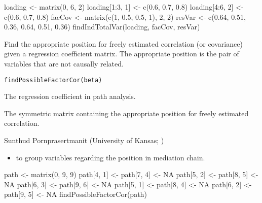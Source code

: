 \documentclass[a4paper]{book}
\begin{document}
%
\begin{Examples}
\begin{ExampleCode}
loading <- matrix(0, 6, 2)
loading[1:3, 1] <- c(0.6, 0.7, 0.8)
loading[4:6, 2] <- c(0.6, 0.7, 0.8)
facCov <- matrix(c(1, 0.5, 0.5, 1), 2, 2)
resVar <- c(0.64, 0.51, 0.36, 0.64, 0.51, 0.36)
findIndTotalVar(loading, facCov, resVar)
\end{ExampleCode}
\end{Examples}
%
\begin{Description}\relax
Find the appropriate position for freely estimated correlation (or covariance) given a regression coefficient matrix. The appropriate position is the pair of variables that are not causally related.
\end{Description}
%
\begin{Usage}
\begin{verbatim}
findPossibleFactorCor(beta)
\end{verbatim}
\end{Usage}
%
\begin{Arguments}
\begin{ldescription}
\item[\code{beta}] 
The regression coefficient in path analysis.

\end{ldescription}
\end{Arguments}
%
\begin{Value}
The symmetric matrix containing the appropriate position for freely estimated correlation.
\end{Value}
%
\begin{Author}\relax
Sunthud Pornprasertmanit (University of Kansas; )
\end{Author}
%
\begin{SeeAlso}\relax
\begin{itemize}

\item {} to group variables regarding the position in mediation chain.

\end{itemize}

\end{SeeAlso}
%
\begin{Examples}
\begin{ExampleCode}
path <- matrix(0, 9, 9)
path[4, 1] <- path[7, 4] <- NA
path[5, 2] <- path[8, 5] <- NA
path[6, 3] <- path[9, 6] <- NA
path[5, 1] <- path[8, 4] <- NA
path[6, 2] <- path[9, 5] <- NA
findPossibleFactorCor(path)
\end{ExampleCode}
\end{Examples}
\end{document}
